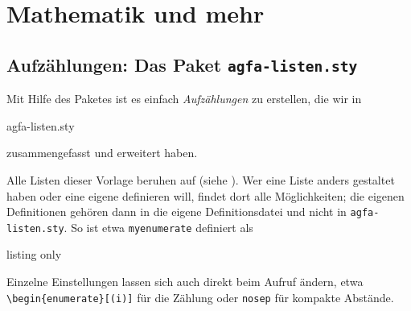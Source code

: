 \thispagestyle{empty}
\section{Mathematik und mehr}\label{sec:section2}
\subsection{Aufzählungen: Das Paket \texttt{agfa-listen.sty}}\label{subsec:agfa-listen}
%
Mit Hilfe des Paketes  ist es einfach \emph{Aufzählungen} zu erstellen, die wir in 
%
\begin{tcolorbox}
agfa-listen.sty
\end{tcolorbox}
%
zusammengefasst und erweitert haben.

Alle Listen dieser Vorlage beruhen auf  (siehe \textcite{enumitem}).
Wer eine Liste anders gestaltet haben oder eine eigene definieren will, findet dort alle Möglichkeiten; die eigenen Definitionen gehören dann in die eigene Definitionsdatei und nicht in \texttt{agfa-listen.sty}.
So ist etwa \texttt{myenumerate} definiert als
%
\begin{tcblisting}{listing only}
\end{tcblisting}
%
Einzelne Einstellungen lassen sich auch direkt beim Aufruf ändern, etwa \verb|\begin{enumerate}[(i)]| für die Zählung oder \texttt{nosep} für kompakte Abstände.

